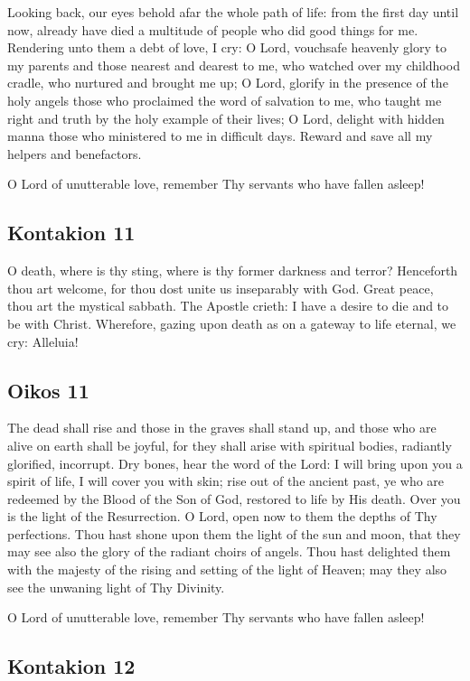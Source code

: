 Looking back, our eyes behold afar the whole path of life: from the first day until now, already have died a multitude of people who did good things for me. Rendering unto them a debt of love, I cry: O Lord, vouchsafe heavenly glory to my parents and those nearest and dearest to me, who watched over my childhood cradle, who nurtured and brought me up; O Lord, glorify in the presence of the holy angels those who proclaimed the word of salvation to me, who taught me right and truth by the holy example of their lives; O Lord, delight with hidden manna those who ministered to me in difficult days. Reward and save all my helpers and benefactors.

O Lord of unutterable love, remember Thy servants who have fallen asleep!

\subsection{Kontakion 11}

O death, where is thy sting, where is thy former darkness and terror? Henceforth thou art welcome, for thou dost unite us inseparably with God. Great peace, thou art the mystical sabbath. The Apostle crieth: I have a desire to die and to be with Christ. Wherefore, gazing upon death as on a gateway to life eternal, we cry: Alleluia!

\subsection{Oikos 11}

The dead shall rise and those in the graves shall stand up, and those who are alive on earth shall be joyful, for they shall arise with spiritual bodies, radiantly glorified, incorrupt. Dry bones, hear the word of the Lord: I will bring upon you a spirit of life, I will cover you with skin; rise out of the ancient past, ye who are redeemed by the Blood of the Son of God, restored to life by His death. Over you is the light of the Resurrection. O Lord, open now to them the depths of Thy perfections. Thou hast shone upon them the light of the sun and moon, that they may see also the glory of the radiant choirs of angels. Thou hast delighted them with the majesty of the rising and setting of the light of Heaven; may they also see the unwaning light of Thy Divinity.

O Lord of unutterable love, remember Thy servants who have fallen asleep!

\subsection{Kontakion 12}

